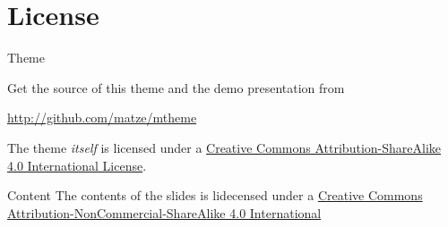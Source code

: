 \section{License}
\begin{frame}{Theme}

  Get the source of this theme and the demo presentation from

  \begin{center}\url{http://github.com/matze/mtheme}\end{center}

  The theme \emph{itself} is licensed under a
  \href{http://creativecommons.org/licenses/by-sa/4.0/}{Creative Commons
  Attribution-ShareAlike 4.0 International License}.

  \begin{center}\ccbysa\end{center}

\end{frame}

\begin{frame}{Content}
	The contents of the slides is lidecensed under a \href{http://creativecommons.org/licenses/by-nc-sa/4.0/}{Creative Commons Attribution-NonCommercial-ShareAlike 4.0 International}
	\begin{center}\ccbyncsa\end{center}
\end{frame}



